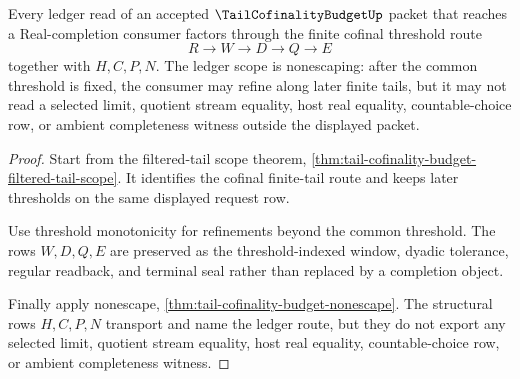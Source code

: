 \begin{theorem}
\label{thm:tail-cofinality-budget-obligation-ledger}
Every ledger read of an accepted $\TailCofinalityBudgetUp$ packet that reaches a Real-completion consumer factors through the finite cofinal threshold route
$$
R \longrightarrow W \longrightarrow D \longrightarrow Q \longrightarrow E
$$
together with $H,C,P,N$. The ledger scope is nonescaping: after the common threshold is fixed, the consumer may refine along later finite tails, but it may not read a selected limit, quotient stream equality, host real equality, countable-choice row, or ambient completeness witness outside the displayed packet.
\end{theorem}
\begin{proof}
Start from the filtered-tail scope theorem, \autoref{thm:tail-cofinality-budget-filtered-tail-scope}. It identifies the cofinal finite-tail route and keeps later thresholds on the same displayed request row.

Use threshold monotonicity for refinements beyond the common threshold. The rows $W,D,Q,E$ are preserved as the threshold-indexed window, dyadic tolerance, regular readback, and terminal seal rather than replaced by a completion object.

Finally apply nonescape, \autoref{thm:tail-cofinality-budget-nonescape}. The structural rows $H,C,P,N$ transport and name the ledger route, but they do not export any selected limit, quotient stream equality, host real equality, countable-choice row, or ambient completeness witness.
\end{proof}

